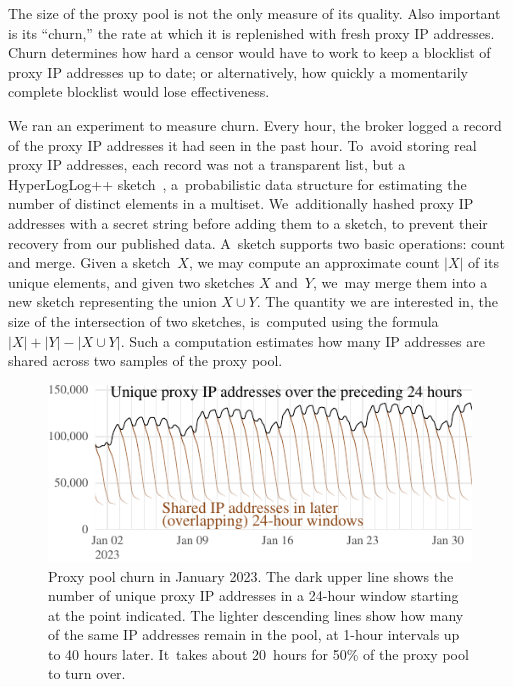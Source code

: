 \documentclass[letterpaper,twocolumn]{article}
\begin{document}
The size of the proxy pool is not the only measure of its quality.
Also important is its ``churn,'' the rate at which
it is replenished with fresh proxy IP addresses.
Churn determines how hard a censor would have to work
to keep a blocklist of proxy IP addresses up to date;
or alternatively,
how quickly a momentarily complete blocklist
would lose effectiveness.

We ran an experiment to measure churn.
Every hour, the broker logged a record of
the proxy IP addresses it had seen in the past hour.
To~avoid storing real proxy IP addresses,
each record was not a transparent list,
but a HyperLogLog++ sketch~\cite{Heule2013a},
a~probabilistic data structure for estimating
the number of distinct elements in a multiset.
We~additionally hashed proxy IP addresses with a secret string
before adding them to a sketch,
to prevent their recovery from our published data.
A~sketch supports two basic operations: count and merge.
Given a sketch~\(X\),
we may compute an approximate count \(|X|\)
of its unique elements,
and given two sketches \(X\) and~\(Y\),
we~may merge them into a new sketch
representing the union \(X \cup Y\).
The quantity we are interested in,
the size of the intersection of two sketches,
is~computed using the formula
\(|X| + |Y| - |X \cup Y|\).
Such a computation estimates
how many IP addresses are shared across
two samples of the proxy pool.

\begin{figure}
\includegraphics{figures/proxy-churn/proxy-count-decay}
\caption{
Proxy pool churn in January 2023.
The dark upper line shows the number
of unique proxy IP addresses in a 24-hour window
starting at the point indicated.
The lighter descending lines show
how many of the same IP addresses remain in the pool,
at 1-hour intervals up to 40 hours later.
It~takes about 20~hours for 50\% of the proxy pool to turn over.
}
\label{fig:proxy-count-decay}
\end{figure}
\end{document}
